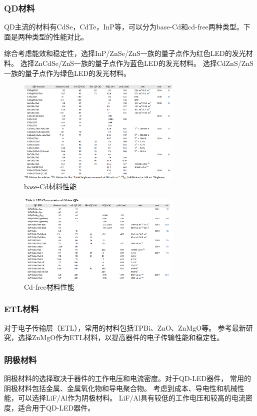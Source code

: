 \documentclass[12pt,hyperref,a4paper,UTF8]{ctexart}
\begin{document}
\subsubsection*{QD材料}
QD主流的材料有CdSe，CdTe，InP等，可以分为base-Cd和cd-free两种类型。下面是两种类型的性能对比。\cite{jang2023quantum}

综合考虑能效和稳定性，选择InP/ZnSe/ZnS一族的量子点作为红色LED的发光材料\cite{won2019highly}。
选择ZnCdSe/ZnS一族的量子点作为蓝色LED的发光材料。
选择CdZnS/ZnS一族的量子点作为绿色LED的发光材料。
\begin{figure}[H]
  \centering
  \includegraphics[width=0.7\textwidth]{figures/fig/table2.png} 
  \caption{base-Cd材料性能\cite{jang2023quantum}}
\end{figure}


\begin{figure}[H]
  \centering
  \includegraphics[width=0.7\textwidth]{figures/fig/table3.png} 
  \caption{Cd-free材料性能\cite{jang2023quantum}}
\end{figure}

\subsubsection*{ETL材料}
对于电子传输层（ETL），常用的材料包括TPBi、ZnO、ZnMgO等。
参考最新研究，选择ZnMgO作为ETL材料，以提高器件的电子传输性能和稳定性。

\subsubsection*{阴极材料}
阴极材料的选择取决于器件的工作电压和电流密度。对于QD-LED器件，
常用的阴极材料包括金属、金属氧化物和导电聚合物。
考虑到成本、导电性和机械性能，可以选择LiF/Al作为阴极材料。
LiF/Al具有较低的工作电压和较高的电流密度，适合用于QD-LED器件。
\end{document}

